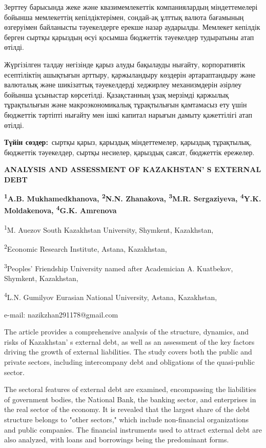 Зерттеу барысында жеке және квазимемлекеттік компаниялардың
міндеттемелері бойынша мемлекеттің кепілдіктерімен, сондай-ақ ұлттық
валюта бағамының өзгеруімен байланысты тәуекелдерге ерекше назар
аударылды. Мемлекет кепілдік берген сыртқы қарыздың өсуі қосымша
бюджеттік тәуекелдер тудыратыны атап өтілді.

Жүргізілген талдау негізінде қарыз алуды бақылауды нығайту,
корпоративтік есептіліктің ашықтығын арттыру, қаржыландыру көздерін
әртараптандыру және валюталық және шикізаттық тәуекелдерді хеджирлеу
механизмдерін әзірлеу бойынша ұсыныстар көрсетілді. Қазақстанның ұзақ
мерзімді қаржылық тұрақтылығын және макроэкономикалық тұрақтылығын
қамтамасыз ету үшін бюджеттік тәртіпті нығайту мен ішкі капитал нарығын
дамыту қажеттілігі атап өтілді.

{\bfseries Түйін сөздер:}~сыртқы қарыз, қарыздық міндеттемелер, қарыздық
тұрақтылық, бюджеттік тәуекелдер, сыртқы несиелер, қарыздық саясат,
бюджеттік ережелер.

\begin{articleheader}
{\bfseries ANALYSIS AND ASSESSMENT OF KAZAKHSTAN' S EXTERNAL DEBT}

{\bfseries
\textsuperscript{1}A.B. Mukhamedkhanova,
\textsuperscript{2}N.N. Zhanakova\textsuperscript{\envelope },
\textsuperscript{3}M.R. Sergaziyeva,
\textsuperscript{4}Y.K. Moldakenova,
\textsuperscript{4}G.K. Amrenova
}
\end{articleheader}

\begin{affiliation}
\textsuperscript{1}M. Auezov South Kazakhstan University, Shymkent, Kazakhstan,

\textsuperscript{2}Economic Research Institute, Astana, Kazakhstan,

\textsuperscript{3}Peoples'{} Friendship University named after Academician A. Kuatbekov, Shymkent, Kazakhstan,

\textsuperscript{4}L.N. Gumilyov Eurasian National University, Astana, Kazakhstan,

e-mail: nazikzhan291178@gmail.com
\end{affiliation}

The article provides a comprehensive analysis of the structure,
dynamics, and risks of Kazakhstan' s external debt, as
well as an assessment of the key factors driving the growth of external
liabilities. The study covers both the public and private sectors,
including intercompany debt and obligations of the quasi-public sector.

The sectoral features of external debt are examined, encompassing the
liabilities of government bodies, the National Bank, the banking sector,
and enterprises in the real sector of the economy. It is revealed that
the largest share of the debt structure belongs to "other sectors,"
which include non-financial organizations and public companies. The
financial instruments used to attract external debt are also analyzed,
with loans and borrowings being the predominant forms.

